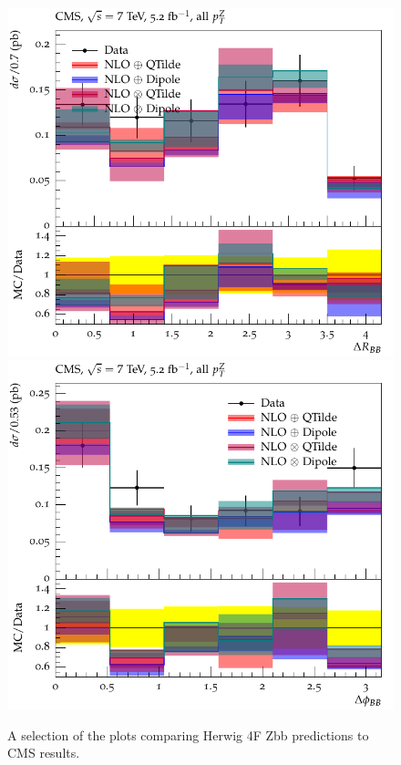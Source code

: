 \documentclass[11pt]{cernrep} \usepackage{graphicx,epsfig} 
\begin{document}
\begin{figure}[htbp]
   \includegraphics[scale=0.65]{figs/zbb/herwigzb/d01-x01-y01.pdf} 
   \includegraphics[scale=0.65]{figs/zbb/herwigzb/d02-x01-y01.pdf} 
\caption{A selection of the plots comparing Herwig 4F Zbb predictions to CMS results.}
\label{zbb-herwigzb-cms}
\end{figure}
\end{document}
